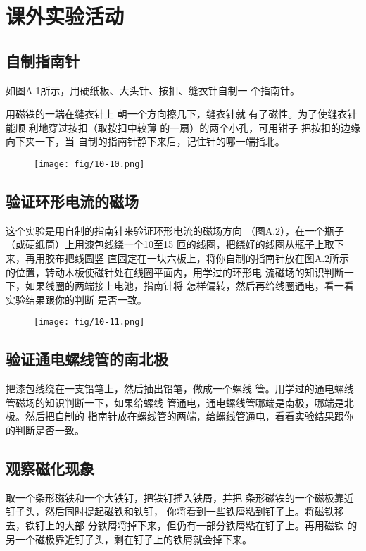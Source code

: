 
\chapter{课外实验活动}
\section{自制指南针}
如图A.1所示，用硬纸板、大头针、按扣、缝衣针自制一
个指南针。

用磁铁的一端在缝衣针上
朝一个方向擦几下，缝衣针就
有了磁性。为了使缝衣针能顺
利地穿过按扣（取按扣中较薄
的一扇）的两个小孔，可用钳子
把按扣的边缘向下夹一下，当
自制的指南针静下来后，记住针的哪一端指北。

\begin{figure}[htp]\centering
    \texttt{[image: fig/10-10.png]}
    \caption{}
    \end{figure}


\section{验证环形电流的磁场}
这个实验是用自制的指南针来验证环形电流的磁场方向
（图A.2），在一个瓶子（或硬纸筒）上用漆包线绕一个10至15
匝的线圈，把绕好的线圈从瓶子上取下来，再用胶布把线圆竖
直固定在一块六板上，将你自制的指南针放在图A.2所示
的位置，转动木板使磁针处在线圈平面内，用学过的环形电
流磁场的知识判断一下，如果线圈的两端接上电池，指南针将
怎样偏转，然后再给线圈通电，看一看实验结果跟你的判断
是否一致。
\begin{figure}[htp]\centering
    \texttt{[image: fig/10-11.png]}
    \caption{}
    \end{figure}

    \section{验证通电螺线管的南北极}
把漆包线绕在一支铅笔上，然后抽出铅笔，做成一个螺线
管。用学过的通电螺线管磁场的知识判断一下，如果给螺线
管通电，通电螺线管哪端是南极，哪端是北极。然后把自制的
指南针放在螺线管的两端，给螺线管通电，看看实验结果跟你
的判断是否一致。

\section{观察磁化现象}
取一个条形磁铁和一个大铁钉，把铁钉插入铁屑，并把
条形磁铁的一个磁极靠近钉子头，然后同时提起磁铁和铁钉，
你将看到一些铁屑粘到钉子上。将磁铁移去，铁钉上的大部
分铁屑将掉下来，但仍有一部分铁屑粘在钉子上。再用磁铁
的另一个磁极靠近钉子头，剩在钉子上的铁屑就会掉下来。

